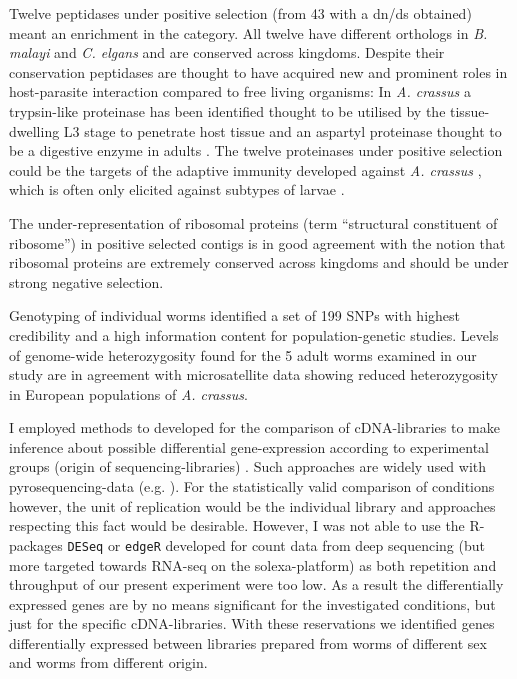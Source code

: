 Twelve peptidases under positive selection (from 43 with a dn/ds
obtained) meant an enrichment in the category. All twelve have different
orthologs in \textit{B. malayi} and \textit{C. elgans} and are
conserved across kingdoms. Despite their conservation peptidases are
thought to have acquired new and prominent roles in host-parasite
interaction compared to free living organisms: In \textit{A. crassus}
a trypsin-like proteinase has been identified thought to be utilised
by the tissue-dwelling L3 stage to penetrate host tissue and an
aspartyl proteinase thought to be a digestive enzyme in adults
\cite{polzer_identification_1993}. The twelve proteinases under positive
selection could be the targets of the adaptive immunity developed
against \textit{A. crassus} \cite{knopf_migratory_2008,
  knopf_vaccination_2008}, which is often only elicited against
subtypes of larvae \cite{molnar_caps}.

The under-representation of ribosomal proteins (term ``structural
constituent of ribosome'') in positive selected contigs is in good
agreement with the notion that ribosomal proteins are extremely
conserved across kingdoms \cite{pmid9664699} and should be under
strong negative selection.

Genotyping of individual worms identified a set of 199 SNPs with
highest credibility and a high information content for
population-genetic studies. Levels of genome-wide heterozygosity found
for the 5 adult worms examined in our study are in agreement with
microsatellite data \cite{wielgoss_population_2008} showing reduced
heterozygosity in European populations of \textit{A. crassus}.

I employed methods to developed for the comparison of cDNA-libraries
to make inference about possible differential gene-expression
according to experimental groups (origin of sequencing-libraries)
\cite{pmid9331369}. Such approaches are widely used with
pyrosequencing-data (e.g. \cite{pmid20470405}). For the statistically
valid comparison of conditions however, the unit of replication would
be the individual library and approaches respecting this fact would be
desirable. However, I was not able to use the R-packages
\texttt{DESeq} \cite{pmid20979621} or \texttt{edgeR}
\cite{pmid19910308} developed for count data from deep sequencing (but
more targeted towards RNA-seq on the solexa-platform) as both
repetition and throughput of our present experiment were too low. As a
result the differentially expressed genes are by no means significant
for the investigated conditions, but just for the specific
cDNA-libraries. With these reservations we identified genes
differentially expressed between libraries prepared from worms of
different sex and worms from different origin.

